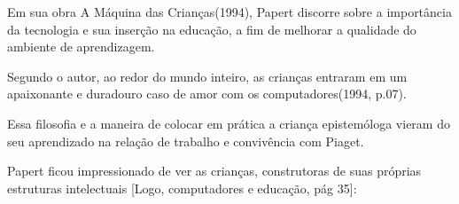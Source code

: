 \documentclass[
12pt,		%
openright,	%
twoside,  %
a4paper,			%
chapter=TITLE,		%
english,			%
french,				%
spanish,			%
brazil				%
]{USPSC-classe/USPSC}
\begin{document}
Em sua obra \textquotedbl A M\'aquina das Crian\c{c}as\textquotedbl  (1994), Papert discorre sobre a import\^ancia da tecnologia e sua inser\c{c}\~ao na educa\c{c}\~ao, a fim de melhorar a qualidade do ambiente de aprendizagem.


















\noindent\begin{center}\mbox{\centering{}}\end{center}


Segundo o autor, \textquotedbl ao redor do mundo inteiro, as crian\c{c}as entraram em um apaixonante e duradouro caso de amor com os computadores\textquotedbl  (1994, p.07).

















Essa filosofia e a maneira de colocar em pr\'atica a crian\c{c}a epistem\'ologa vieram do seu aprendizado na rela\c{c}\~ao de trabalho e conviv\^encia com Piaget.

















Papert ficou impressionado de ver as crian\c{c}as, construtoras de suas pr\'oprias estruturas intelectuais [Logo, computadores e educa\c{c}\~ao, p\'ag 35]:
\end{document}
